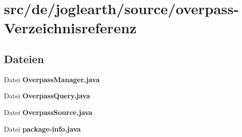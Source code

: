\section{src/de/joglearth/source/overpass-\/\-Verzeichnisreferenz}
\label{dir_a18d679b90165f4b88c25188fbad6065}
\subsection*{Dateien}
\begin{DoxyCompactItemize}
\item 
Datei {\bfseries Overpass\-Manager.\-java}
\item 
Datei {\bfseries Overpass\-Query.\-java}
\item 
Datei {\bfseries Overpass\-Source.\-java}
\item 
Datei {\bfseries package-\/info.\-java}
\end{DoxyCompactItemize}
